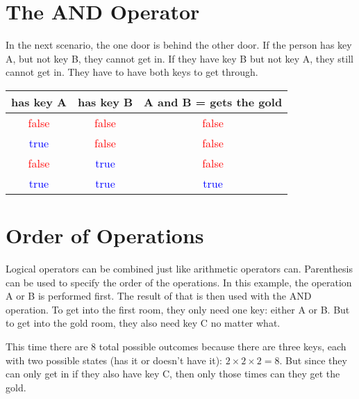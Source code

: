 \section{The AND Operator}

In the next scenario, the one door is behind the other door. If the person has key A, but not key B, they cannot get in. If they have key B but not key A, they still cannot get in. They have to have both keys to get through.\\

\begin{center} \end{center}

\begin{center}
	\begin{tabular}{c | c | c}
		has key A & has key B & A and B = gets the gold \\ \hline
		\textcolor{red}{false} & \textcolor{red}{false} & \textcolor{red}{false}\\ \hline
		\textcolor{blue}{true} & \textcolor{red}{false} & \textcolor{red}{false} \\ \hline
		\textcolor{red}{false} & \textcolor{blue}{true} & \textcolor{red}{false} \\ \hline
		\textcolor{blue}{true} & \textcolor{blue}{true} & \textcolor{blue}{true} \\ \hline
	\end{tabular}
\end{center}

\section{Order of Operations}

Logical operators can be combined just like arithmetic operators can. Parenthesis can be used to specify the order of the operations. In this example, the operation A or B is performed first. The result of that is then used with the AND operation. To get into the first room, they only need one key: either A or B. But to get into the gold room, they also need key C no matter what.\\

\begin{center} \end{center}

This time there are 8 total possible outcomes because there are three keys, each with two possible states (has it or doesn't have it): \(2 \times 2 \times 2 = 8 \). But since they can only get in if they also have key C, then only those times can they get the gold.

